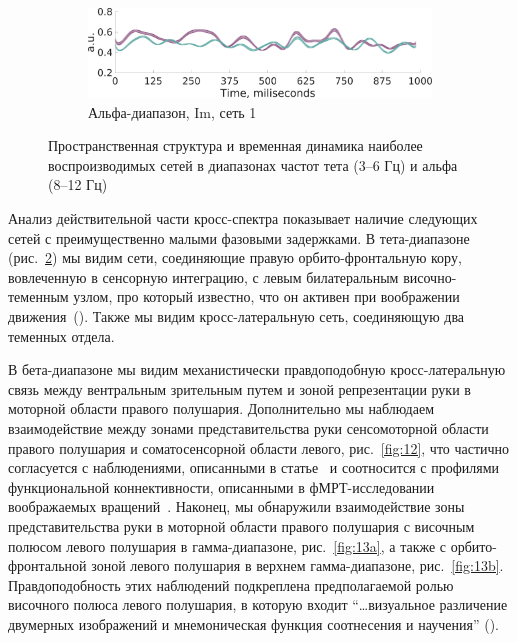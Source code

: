 \begin{figure}
\begin{subfigure}[b]{0.4\textwidth}
 \includegraphics[width=\textwidth]{../images/psiicos_paper/Figure11_b2.jpg}
 \caption{Альфа-диапазон, Im, сеть 1}\label{fig:11b}
 \end{subfigure}
 \caption{Пространственная структура и временная динамика наиболее воспроизводимых сетей в диапазонах частот тета (3--6 Гц) и альфа (8--12 Гц)}\label{fig:11}
\end{figure} %

Анализ действительной части кросс-спектра показывает наличие следующих сетей с преимущественно
малыми фазовыми задержками. В тета-диапазоне (рис.~\ref{fig:11}) мы видим сети,
соединяющие правую орбито-фронтальную кору, вовлеченную в сенсорную интеграцию, с левым
билатеральным височно-теменным узлом, про который известно, что он активен при воображении
движения~(\cite{Hanakawa2008}). Также мы видим кросс-латеральную сеть, соединяющую два
теменных отдела.

В бета-диапазоне мы видим механистически правдоподобную кросс-латеральную связь
между вентральным зрительным путем и зоной репрезентации руки в моторной
области правого полушария. Дополнительно мы наблюдаем взаимодействие между
зонами представительства руки сенсомоторной области правого полушария и
соматосенсорной области левого, рис.~\ref{fig:12}, что частично
согласуется с наблюдениями, описанными в статье~\cite{Lamm2007} и соотносится
с профилями функциональной коннективности, описанными в  фМРТ-исследовании
воображаемых вращений~\cite{Striem-Amit2017}. Наконец, мы обнаружили взаимодействие
зоны представительства руки в моторной области правого полушария с височным полюсом
левого полушария в гамма-диапазоне, рис.~\ref{fig:13a}, а также с
орбито-фронтальной зоной левого полушария в верхнем гамма-диапазоне, рис.~\ref{fig:13b}.
Правдоподобность этих наблюдений подкреплена предполагаемой
ролью височного полюса левого полушария, в которую входит ``\ldots визуальное различение
двумерных изображений и мнемоническая функция соотнесения и научения'' (\cite{Dupont2002}).

